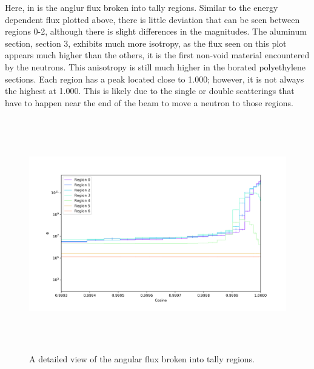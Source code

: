 Here, in  is the anglur flux broken into tally regions.
Similar to the energy dependent flux plotted above, there is little deviation that can be seen between regions 0-2, although there is slight differences in the magnitudes.
The aluminum section, section 3, exhibits much more isotropy, as the flux seen on this plot appears much higher than the others, it is the first non-void material encountered by the neutrons.
This anisotropy is still much higher in the borated polyethylene sections.
Each region has a peak located close to 1.000; however, it is not always the highest at 1.000.
This is likely due to the single or double scatterings that have to happen near the end of the beam to move a neutron to those regions.


\begin{figure}[htb]
\centering
\includegraphics[height=4in]{tex/figures/flux_rad_cos_detail.png}
\caption[Detailed Regional Flux vs. Angle]{A detailed view of the angular flux broken into tally regions.}
\label{fig:flux_rad_cos_detail}
\end{figure}

